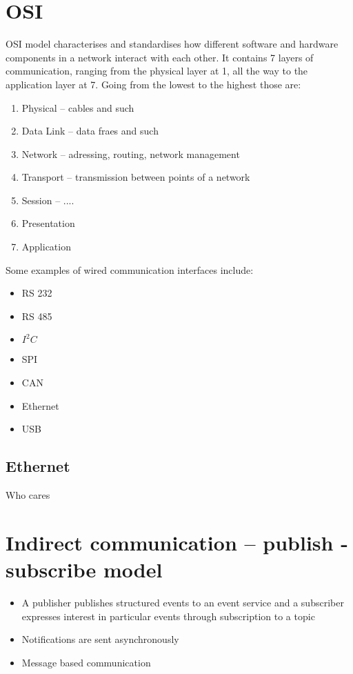\section{OSI}
{
    OSI model characterises and standardises how different software and hardware components in a network interact with each other. It contains 7 layers of communication, ranging from the physical layer at 1, all the way to the application layer at 7. Going from the lowest to the highest those are:
    \begin{enumerate}
        \item Physical -- cables and such
        \item Data Link -- data fraes and such
        \item Network -- adressing, routing, network management
        \item Transport -- transmission between points of a network
        \item Session -- ....
        \item Presentation
        \item Application
    \end{enumerate}
}

{
    Some examples of wired communication interfaces include:
    \begin{itemize}
        \item RS 232
        \item RS 485
        \item $I^{2}C$ 
        \item SPI
        \item CAN
        \item Ethernet
        \item USB
        
    \end{itemize}
}

\subsection{Ethernet}
Who cares

\section{Indirect communication -- publish -subscribe model}
\begin{itemize}
        \item A publisher publishes structured events to an event service and a subscriber expresses interest in particular events through subscription to a topic
        \item Notifications are sent asynchronously
        \item Message based communication 
\end{itemize}

